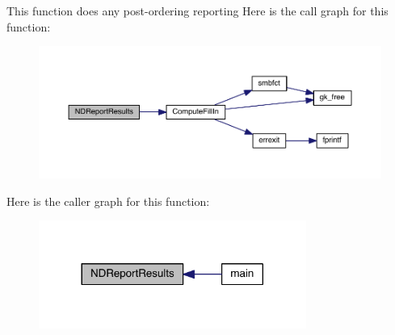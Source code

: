 This function does any post-\/ordering reporting Here is the call graph for this function\+:\nopagebreak
\begin{figure}[H]
\begin{center}
\leavevmode
\includegraphics[width=350pt]{a00326_ae474b9ac69c59e61afcdd45e4c2913f0_cgraph}
\end{center}
\end{figure}
Here is the caller graph for this function\+:\nopagebreak
\begin{figure}[H]
\begin{center}
\leavevmode
\includegraphics[width=248pt]{a00326_ae474b9ac69c59e61afcdd45e4c2913f0_icgraph}
\end{center}
\end{figure}
